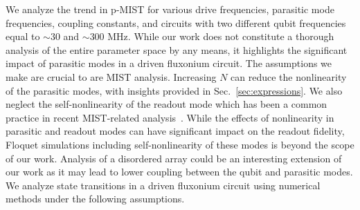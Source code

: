 \documentclass[%
reprint,
superscriptaddress,
 amsmath,amssymb,
 aps,
 prx,
longbibliography,
floatfix,
]{revtex4-2}
\newcommand{\sh}[1]{{\color{orange}{{}[SS: #1]}}}%
\begin{document}
We analyze the trend in p-MIST for various drive frequencies, parasitic mode frequencies, coupling constants, and circuits with two different qubit frequencies equal to $\sim 30$ and $\sim 300$ MHz. While our work does not constitute a thorough analysis of the entire parameter space by any means, it highlights the significant impact of parasitic modes in a driven fluxonium circuit. The assumptions we make are crucial to are MIST analysis. Increasing $N$ can reduce the nonlinearity of the parasitic modes, with insights provided in Sec.~\ref{sec:expressions}. We also neglect the self-nonlinearity of the readout mode which has been a common practice in recent MIST-related analysis~\cite{shillito2022dynamics,dumas2024unified,cohen2023reminiscence}. While the effects of nonlinearity in parasitic and readout modes can have significant impact on the readout fidelity, Floquet simulations including self-nonlinearity of these modes is beyond the scope of our work. Analysis of a disordered array could be an interesting extension of our work as it may lead to lower coupling between the qubit and parasitic modes. We analyze state transitions in a driven fluxonium circuit  using numerical methods under the following assumptions. 

\end{document}
